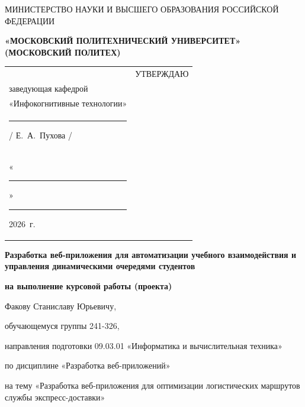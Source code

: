 \documentclass[14pt, a4paper]{extarticle}
\begin{document}
\pagestyle{empty}


\begin{center}
    {\small МИНИСТЕРСТВО НАУКИ И ВЫСШЕГО ОБРАЗОВАНИЯ РОССИЙСКОЙ ФЕДЕРАЦИИ}


    {\small \textbf{«МОСКОВСКИЙ ПОЛИТЕХНИЧЕСКИЙ УНИВЕРСИТЕТ»}} \\
    {\small \textbf{(МОСКОВСКИЙ ПОЛИТЕХ)}}
\end{center}

\begin{tabularx}{\textwidth}{@{} p{} p{} @{}}
     &
    \raggedright
    УТВЕРЖДАЮ                          \\
    заведующая кафедрой                \\
    «Инфокогнитивные технологии»       \\[0.3cm]

    \rule{3cm}{0.4pt} / Е.~А.~Пухова / \\[0.1cm]

    «\rule{0.8cm}{0.4pt}» \rule{3cm}{0.4pt} 2026~г.
\end{tabularx}


\begin{center}

    { \large \textbf{Разработка веб-приложения для автоматизации учебного взаимодействия и управления динамическими очередями студентов}}

    \textbf{на выполнение курсовой работы (проекта)}

    Факову Станиславу Юрьевичу, %

\end{center}

обучающемуся группы 241-326,

направления подготовки 09.03.01 «Информатика и вычислительная техника»

по дисциплине «Разработка веб-приложений»

на тему «Разработка веб-приложения для оптимизации логистических
маршрутов службы экспресс-доставки»
\end{document}
